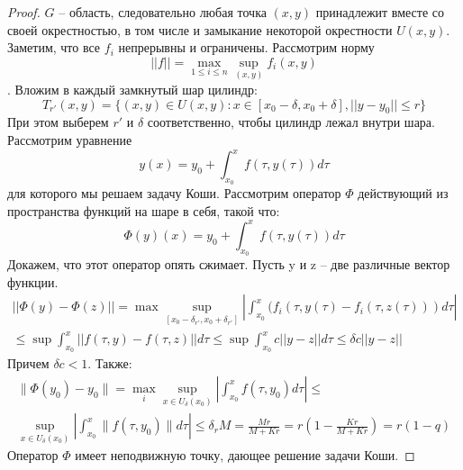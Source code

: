 \documentclass[document.tex]{subfiles}
\begin{document}
\begin{proof}
	$G$ -- область, следовательно любая точка $(x, y)$ принадлежит вместе со своей окрестностью, в том числе и замыкание некоторой окрестности
	$U(x, y)$. Заметим, что все $f_i$ непрерывны и ограничены.
	Рассмотрим норму $$||f|| = \max_{1 \leq i \leq n} \sup_{(x, y)} f_i(x, y)$$. Вложим в каждый замкнутый шар цилиндр: 
	$$T_{r'}(x, y) = \{(x, y) \in U(x, y) : x \in [x_0 - \delta, x_0 + \delta], ||y - y_0|| \leq r\}$$
	При этом выберем $r'$ и $\delta$ соответственно, чтобы цилиндр лежал внутри шара.
	Рассмотрим уравнение $$y(x) = y_0 + \int_{x_0}^x f(\tau, y(\tau))d\tau$$ для которого мы решаем задачу Коши. Рассмотрим оператор $\Phi$
	действующий из пространства функций на шаре в себя, такой что:
	$$\Phi (y) (x) = y_0 + \int_{x_0}^x f(\tau, y(\tau)) d\tau$$
	Докажем, что этот оператор опять сжимает. Пусть y и z -- две различные вектор функции.
	\begin{multline*}
		||\Phi(y) - \Phi(z)|| = \max \sup_{[x_0 - \delta_{r'}, x_0 + \delta_{r'}]} | \int_{x_0}^x (f_i(\tau, y(\tau) - f_i(\tau, z(\tau)))d\tau| \\
		\leq \sup \int_{x_0}^x ||f(\tau, y) - f(\tau, z)||d\tau \leq \sup \int_{x_0}^x c ||y-z||d\tau \leq \delta c||y-z||
	\end{multline*}
	Причем $\delta c < 1$. Также:
	\begin{multline*}
		\|\Phi(y_0) - y_0\| = \max_{i} \sup_{x \in U_{\delta}(x_0)} \left| \int_{x_0}^{x}f(\tau, y_0)d \tau \right| \leq \\
		\sup_{x \in U_{\delta}(x_0)} \left| \int_{x_0}^{x}\|f(\tau, y_0)\| d \tau \right| \leq \delta_r M = \frac{Mr}{M+Kr} = r(1 - \frac{Kr}{M+Kr}) = r(1-q)
	\end{multline*}
	Оператор $\Phi$ имеет неподвижную точку, дающее решение задачи Коши.
	
\end{proof}
\end{document}
